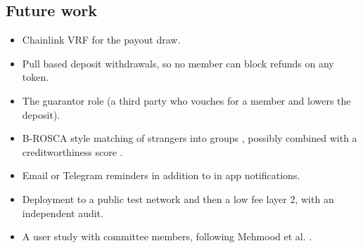 \subsection{Future work}
\begin{itemize}
  \item Chainlink VRF \cite{chainlinkvrf} for the payout draw.
  \item Pull based deposit withdrawals, so no member can block refunds on any token.
  \item The guarantor role (a third party who vouches for a member and lowers the deposit).
  \item B-ROSCA style matching of strangers into groups \cite{batool2023}, possibly combined with a
        creditworthiness score \cite{sharma2024}.
  \item Email or Telegram reminders in addition to in app notifications.
  \item Deployment to a public test network and then a low fee layer 2, with an independent audit.
  \item A user study with committee members, following Mehmood et al. \cite{mehmood2019}.
\end{itemize}
